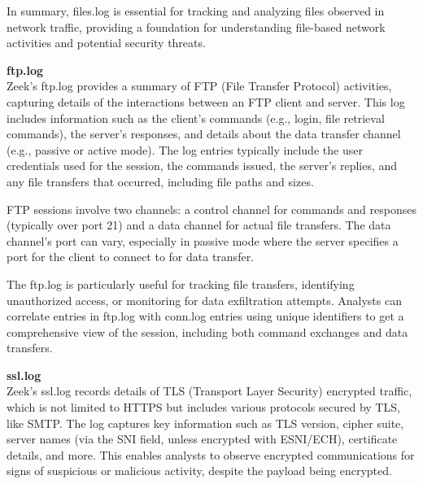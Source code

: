 In summary, \colorbox{gray!20}{files.log} is essential for tracking and analyzing files observed in network traffic, providing a foundation for understanding file-based network activities and potential security threats.
\\
\vspace{1cm}



\noindent \Large \textbf{ftp.log}
\vspace{5pt}
\\
\normalsize
Zeek's \colorbox{gray!20}{ftp.log} provides a summary of FTP (File Transfer Protocol) activities, capturing details of the interactions between an FTP client and server. This log includes information such as the client's commands (e.g., login, file retrieval commands), the server's responses, and details about the data transfer channel (e.g., passive or active mode). The log entries typically include the user credentials used for the session, the commands issued, the server's replies, and any file transfers that occurred, including file paths and sizes.

FTP sessions involve two channels: a control channel for commands and responses (typically over port 21) and a data channel for actual file transfers. The data channel's port can vary, especially in passive mode where the server specifies a port for the client to connect to for data transfer.

The \colorbox{gray!20}{ftp.log} is particularly useful for tracking file transfers, identifying unauthorized access, or monitoring for data exfiltration attempts. Analysts can correlate entries in \colorbox{gray!20}{ftp.log} with conn.log entries using unique identifiers to get a comprehensive view of the session, including both command exchanges and data transfers.
\\
\vspace{1cm}


\noindent \Large \textbf{ssl.log}
\vspace{5pt}
\\
\normalsize
Zeek's \colorbox{gray!20}{ssl.log} records details of TLS (Transport Layer Security) encrypted traffic, which is not limited to HTTPS but includes various protocols secured by TLS, like SMTP. The log captures key information such as TLS version, cipher suite, server names (via the SNI field, unless encrypted with ESNI/ECH), certificate details, and more. This enables analysts to observe encrypted communications for signs of suspicious or malicious activity, despite the payload being encrypted.

